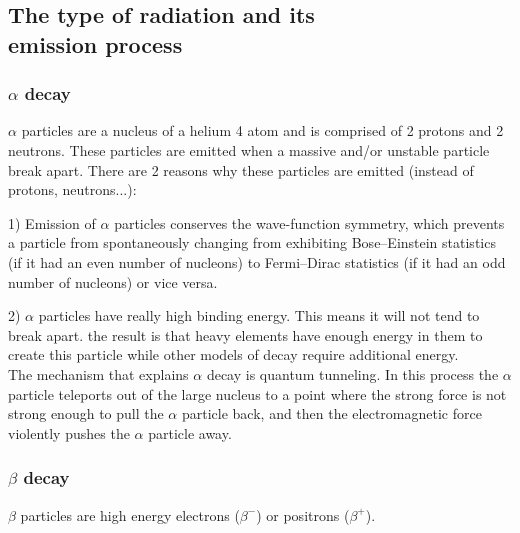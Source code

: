 \documentclass[]{article}
\begin{document}
\subsection{The type of radiation and its \\ emission process}
\subsubsection{$\alpha$ decay}

$\alpha$ particles are a nucleus of a helium 4 atom and is comprised of 2 protons and 2 neutrons. These particles are emitted when a massive and/or unstable particle break apart. 
There are 2 reasons why these particles are emitted (instead of protons, neutrons...):

1) Emission of $\alpha$ particles conserves the wave-function symmetry, which prevents a particle from spontaneously changing from exhibiting Bose–Einstein statistics (if it had an even number of nucleons) to Fermi–Dirac statistics (if it had an odd number of nucleons) or vice versa.

2) $\alpha$ particles have really high binding energy. This means it will not tend to break apart. the result is that heavy elements have enough energy in them to create this particle while other models of decay require additional energy. \\
The mechanism that explains $\alpha$ decay is quantum tunneling. In this process the $\alpha$ particle teleports out of the large nucleus to a point where the strong force is not strong enough to pull the $\alpha$ particle back, and then the electromagnetic force violently pushes the $\alpha$ particle away.

\subsubsection{$\beta$ decay}

$\beta$ particles are high energy electrons ($\beta^-$) or positrons ($\beta^+$). 
\end{document}
